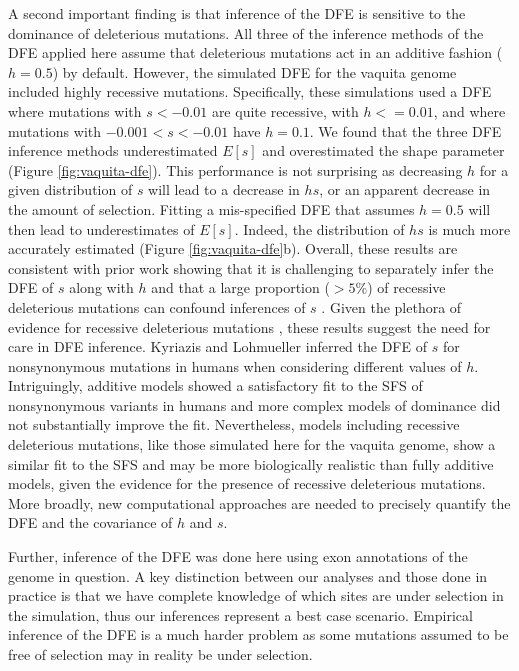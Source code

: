 \documentclass[hidelinks]{article}
\begin{document}
    A second important finding is that inference of the DFE
    is sensitive to the dominance of deleterious mutations.
    All three of the inference methods of the DFE applied here assume that deleterious mutations act
    in an additive fashion ($h=0.5$) by default.
    However, the simulated DFE for the vaquita genome included highly recessive mutations.
    Specifically, these simulations used a DFE where mutations with $s<-0.01$ are quite recessive, 
    with $h<=0.01$, and where mutations with $-0.001<s<-0.01$ have $h=0.1$.
    We found that the three DFE inference methods underestimated $E[s]$ and overestimated the shape parameter (Figure \ref{fig:vaquita-dfe}).
    This performance is not surprising as decreasing $h$ for a given distribution of $s$ will lead to a decrease in $hs$,
    or an apparent decrease in the amount of selection.
    Fitting a mis-specified DFE that assumes $h=0.5$ will then lead to underestimates of $E[s]$.
    Indeed, the distribution of $hs$ is much more accurately estimated (Figure \ref{fig:vaquita-dfe}b).
    Overall, these results are consistent with prior work showing that it is challenging to separately
    infer the DFE of $s$ along with $h$ \citep{veeramah2014evidence, kyriazis2024constraining, balick2022overcoming}
    and that a large proportion ($>5\%$) of recessive deleterious mutations can confound inferences of $s$ \citep{wade2023quantifying}.
    Given the plethora of evidence for recessive deleterious mutations 
    \citep{mukai1972mutation, agrawal2011inferences, huber2018gene, di2024revisiting,},
    these results suggest the need for care in DFE inference.
    Kyriazis and Lohmueller \citeyear{kyriazis2024constraining} inferred the DFE of $s$ for nonsynonymous mutations
    in humans when considering different values of $h$.
    Intriguingly, additive models showed a satisfactory fit to the SFS of nonsynonymous variants in humans
    and more complex models of dominance did not substantially improve the fit.
    Nevertheless, models including recessive deleterious mutations, like those simulated here for the vaquita genome,
    show a similar fit to the SFS and may be more biologically realistic than fully additive models,
    given the evidence for the presence of recessive deleterious mutations.
    More broadly, new computational approaches are needed to precisely quantify the DFE and the covariance of $h$ and $s$.

    Further, inference of the DFE was done here using exon annotations of the genome in question.
    A key distinction between our analyses and those done in practice
    is that we have complete knowledge of which sites are under selection in the simulation,
    thus our inferences represent a best case scenario. Empirical inference of the DFE is a much
    harder problem as some mutations assumed to be free of selection
    may in reality be under selection.
\end{document}
